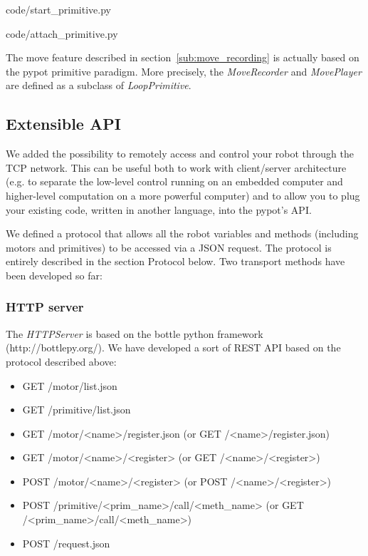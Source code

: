 
    {code/start_primitive.py}


    {code/attach_primitive.py}

The move feature described in section~\ref{sub:move_recording} is actually based on the pypot primitive paradigm. More precisely, the \emph{MoveRecorder} and \emph{MovePlayer} are defined as a subclass of \emph{LoopPrimitive}.

\subsection{Extensible API} %

We added the possibility to remotely access and control your robot through the TCP network. This can be useful both to work with client/server architecture (e.g. to separate the low-level control running on an embedded computer and higher-level computation on a more powerful computer) and to allow you to plug your existing code, written in another language, into the pypot’s API.

We defined a protocol that allows all the robot variables and methods (including motors and primitives) to be accessed via a JSON request. The protocol is entirely described in the section Protocol below. Two transport methods have been developed so far:

\subsubsection{HTTP server} %

The \emph{HTTPServer }is based on the bottle python framework (http://bottlepy.org/). We have developed a sort of REST API based on the protocol described above:

\begin{itemize}
    \item GET /motor/list.json
    \item GET /primitive/list.json
    \item GET /motor/<name>/register.json (or GET /<name>/register.json)
    \item GET /motor/<name>/<register> (or GET /<name>/<register>)
    \item POST /motor/<name>/<register> (or POST /<name>/<register>)
    \item POST /primitive/<prim\_name>/call/<meth\_name> (or GET /<prim\_name>/call/<meth\_name>)
    \item POST /request.json
\end{itemize}


